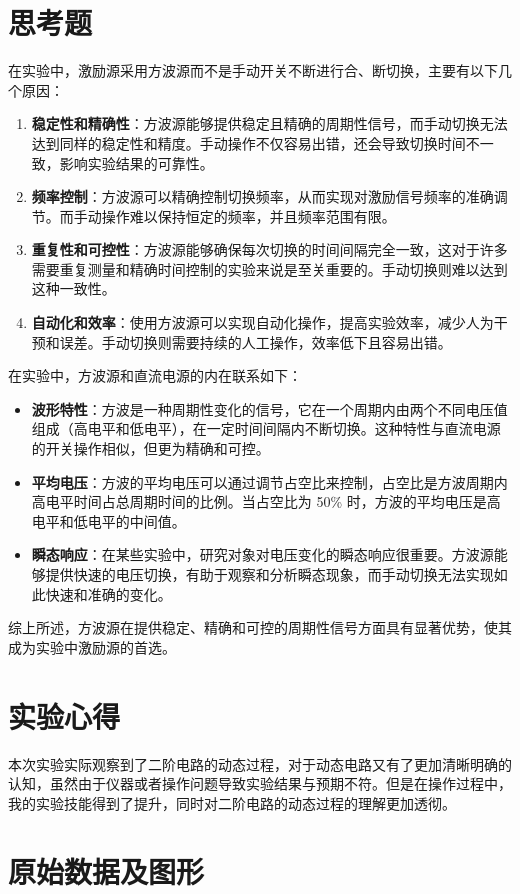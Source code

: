 \documentclass[a4paper,utf8]{article}
\begin{document}
\section{思考题}
在实验中，激励源采用方波源而不是手动开关不断进行合、断切换，主要有以下几个原因：
\begin{enumerate}
    \item \textbf{稳定性和精确性}：方波源能够提供稳定且精确的周期性信号，而手动切换无法达到同样的稳定性和精度。手动操作不仅容易出错，还会导致切换时间不一致，影响实验结果的可靠性。
    \item \textbf{频率控制}：方波源可以精确控制切换频率，从而实现对激励信号频率的准确调节。而手动操作难以保持恒定的频率，并且频率范围有限。
    \item \textbf{重复性和可控性}：方波源能够确保每次切换的时间间隔完全一致，这对于许多需要重复测量和精确时间控制的实验来说是至关重要的。手动切换则难以达到这种一致性。
    \item \textbf{自动化和效率}：使用方波源可以实现自动化操作，提高实验效率，减少人为干预和误差。手动切换则需要持续的人工操作，效率低下且容易出错。
\end{enumerate}\par
在实验中，方波源和直流电源的内在联系如下：
\begin{itemize}
    \item \textbf{波形特性}：方波是一种周期性变化的信号，它在一个周期内由两个不同电压值组成（高电平和低电平），在一定时间间隔内不断切换。这种特性与直流电源的开关操作相似，但更为精确和可控。
    \item \textbf{平均电压}：方波的平均电压可以通过调节占空比来控制，占空比是方波周期内高电平时间占总周期时间的比例。当占空比为 50\% 时，方波的平均电压是高电平和低电平的中间值。
    \item \textbf{瞬态响应}：在某些实验中，研究对象对电压变化的瞬态响应很重要。方波源能够提供快速的电压切换，有助于观察和分析瞬态现象，而手动切换无法实现如此快速和准确的变化。
\end{itemize}

综上所述，方波源在提供稳定、精确和可控的周期性信号方面具有显著优势，使其成为实验中激励源的首选。

\section{实验心得}
    本次实验实际观察到了二阶电路的动态过程，对于动态电路又有了更加清晰明确的认知，虽然由于仪器或者操作问题导致实验结果与预期不符。但是在操作过程中，我的实验技能得到了提升，同时对二阶电路的动态过程的理解更加透彻。
\section{原始数据及图形}
    \begin{center}
    \end{center}
    
\end{document}
